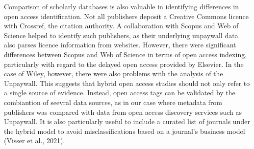 \documentclass[a4paper,man,floatsintext,longtable,noextraspace,10pt]{apa6}
\begin{document}
Comparison of scholarly databases is also valuable in identifying
differences in open access identification. Not all publishers deposit a
Creative Commons licence with Crossref, the citation authority. A
collaboration with Scopus and Web of Science helped to identify such
publishers, as their underlying unpaywall data also parses licence
information from websites. However, there were significant differences
between Scopus and Web of Science in terms of open access indexing,
particularly with regard to the delayed open access provided by
Elsevier. In the case of Wiley, however, there were also problems with
the analysis of the Unpaywall. This suggests that hybrid open access
studies should not only refer to a single source of evidence. Instead,
open access tags can be validated by the combiantion of seevral data
sources, as in our case where metadata from publishers was compared with
data from open access discovery services such as Unpaywall. It is also
particularly useful to include a curated list of journals under the
hybrid model to avoid misclassifications based on a journal's business
model (Visser et al., 2021).
\end{document}
